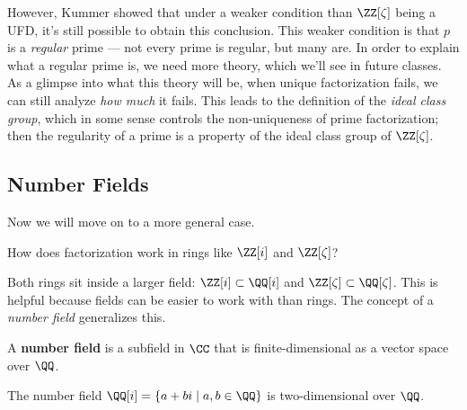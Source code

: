 However, Kummer showed that under a weaker condition than $\ZZ[\zeta]$ being a UFD, it's still possible to obtain this conclusion. This weaker condition is that $p$ is a \emph{regular} prime --- not every prime is regular, but many are. In order to explain what a regular prime is, we need more theory, which we'll see in future classes. As a glimpse into what this theory will be, when unique factorization fails, we can still analyze \emph{how much} it fails. This leads to the definition of the \emph{ideal class group}, which in some sense controls the non-uniqueness of prime factorization; then the regularity of a prime is a property of the ideal class group of $\ZZ[\zeta]$. 



\subsection{Number Fields}

Now we will move on to a more general case. 

\begin{qq}
How does factorization work in rings like $\ZZ[i]$ and $\ZZ[\zeta]$?
\end{qq}

Both rings sit inside a larger field: $\ZZ[i] \subset \QQ[i]$ and $\ZZ[\zeta] \subset \QQ[\zeta]$. This is helpful because fields can be easier to work with than rings. The concept of a \emph{number field} generalizes this.

\begin{definition}
A \textbf{number field} is a subfield in $\CC$ that is finite-dimensional as a vector space over $\QQ$.
\end{definition}

\begin{example}
The number field $\QQ[i] = \{a + bi \mid a, b \in \QQ\}$ is two-dimensional over $\QQ$.
\end{example}

